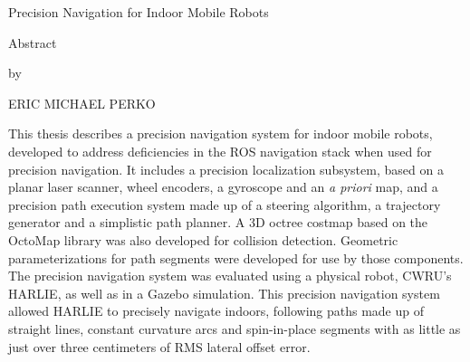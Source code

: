 \begin{center}
    Precision Navigation for Indoor Mobile Robots

    \vspace{0.1\textheight}

    Abstract

    by

    ERIC MICHAEL PERKO
\end{center}

This thesis describes a precision navigation system for indoor mobile robots, developed to address deficiencies in the ROS navigation stack when used for precision navigation. It includes a precision localization subsystem, based on a planar laser scanner, wheel encoders, a gyroscope and an \emph{a priori} map, and a precision path execution system made up of a steering algorithm, a trajectory generator and a simplistic path planner. A 3D octree costmap based on the OctoMap library was also developed for collision detection. Geometric parameterizations for path segments were developed for use by those components. The precision navigation system was evaluated using a physical robot, CWRU's HARLIE, as well as in a Gazebo simulation. This precision navigation system allowed HARLIE to precisely navigate indoors, following paths made up of straight lines, constant curvature arcs and spin-in-place segments with as little as just over three centimeters of RMS lateral offset error.